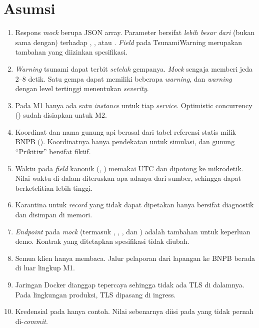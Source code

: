 \section{Asumsi}

\begin{enumerate}
 \item Respons \emph{mock} berupa JSON array. Parameter  bersifat \emph{lebih besar dari} (bukan sama dengan) terhadap , , atau . \emph{Field}  pada TsunamiWarning merupakan tambahan yang diizinkan spesifikasi.
 \item \emph{Warning} tsunami dapat terbit \emph{setelah} gempanya. \emph{Mock} sengaja memberi jeda 2--8 detik. Satu gempa dapat memiliki beberapa \emph{warning}, dan \emph{warning} dengan level tertinggi menentukan \emph{severity}.
 \item Pada M1 hanya ada satu \emph{instance} untuk tiap \emph{service}. Optimistic concurrency () sudah disiapkan untuk M2.
 \item Koordinat dan nama gunung api berasal dari tabel referensi statis milik BNPB (). Koordinatnya hanya pendekatan untuk simulasi, dan gunung ``Prikitiw'' bersifat fiktif.
 \item Waktu pada \emph{field} kanonik (, ) memakai UTC dan dipotong ke mikrodetik. Nilai waktu di dalam  diteruskan apa adanya dari sumber, sehingga dapat berketelitian lebih tinggi.
 \item Karantina untuk \emph{record} yang tidak dapat dipetakan hanya bersifat diagnostik dan disimpan di memori.
 \item \emph{Endpoint}  pada \emph{mock} (termasuk , , , dan ) adalah tambahan untuk keperluan demo. Kontrak yang ditetapkan spesifikasi tidak diubah.
 \item Semua klien hanya membaca. Jalur pelaporan dari lapangan ke BNPB berada di luar lingkup M1.
 \item Jaringan Docker dianggap tepercaya sehingga tidak ada TLS di dalamnya. Pada lingkungan produksi, TLS dipasang di ingress.
 \item Kredensial pada  hanya contoh. Nilai sebenarnya diisi pada  yang tidak pernah di-\emph{commit}.
\end{enumerate}

